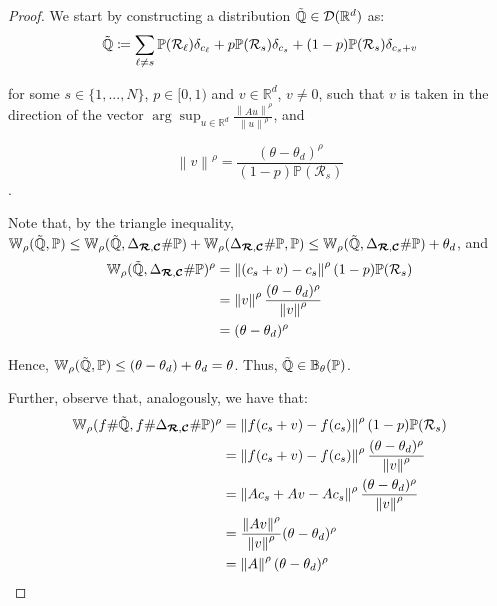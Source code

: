 \documentclass[10pt,a4paper]{amsart}
\def\bsC{{\bm{\mathcal{C}}}}
\def\bsR{{\bm{\mathcal{R}}}}
\def\probQ{\mathbb{Q}}
\def\prob{\mathbb{P}}
\def\realNum{{\mathbb{R}}}
\def\sD{{\mathcal{D}}}
\def\sR{{\mathcal{R}}}
\def\wasserstein{{\mathbb{W}}}
\newcommand{\norm}[1]{\left\lVert#1\right\rVert}
\begin{document}
    \begin{proof}
    We start by constructing a distribution $\Tilde{\probQ} \in \sD(\realNum^d)$ as: 
    \begin{align*}
        \Tilde{\probQ} \coloneqq \sum_{\ell \neq s} \prob(\sR_\ell) \delta_{c_\ell} + p \prob(\sR_s) \delta_{c_s} + (1-p) \prob(\sR_s) \delta_{c_s + v}
    \end{align*}
    
    for some $s \in \{1, ..., N\}$, $p \in [0, 1)$ and $v \in \realNum^d$, $v \neq 0$, such that $v$ is taken in the direction of the vector $\arg\sup_{u \in \realNum^d} \frac{\norm{Au}^\rho}{\norm{u}^\rho}$, and
    
    $$\norm{v}^\rho = \frac{(\theta-\theta_d)^\rho}{(1-p)\prob(\sR_s)}$$. 
    
    Note that, by the triangle inequality, $\wasserstein_\rho(\Tilde{\probQ}, \prob) \leq \wasserstein_\rho(\Tilde{\probQ}, \Delta_{\bsR, \bsC}\#\prob) + \wasserstein_\rho(\Delta_{\bsR, \bsC}\#\prob, \prob) \leq \wasserstein_\rho(\Tilde{\probQ}, \Delta_{\bsR, \bsC}\#\prob) + \theta_d$, and
    \begin{align*}
        \wasserstein_\rho(\Tilde{\probQ}, \Delta_{\bsR, \bsC}\#\prob)^\rho &= \norm{(c_s + v) - c_s}^\rho (1-p)\prob(\sR_s) \\ 
        &= \norm{v}^\rho \frac{(\theta-\theta_d)^\rho}{\norm{v}^\rho} \\ 
        &= (\theta-\theta_d)^\rho
    \end{align*}
    
    Hence, $\wasserstein_\rho(\Tilde{\probQ}, \prob) \leq (\theta-\theta_d) + \theta_d = \theta$. Thus, $\Tilde{\probQ} \in \mathbb{B}_{\theta}(\prob)$.
    
    Further, observe that, analogously, we have that:
    \begin{align*}
        \wasserstein_\rho(f \# \Tilde{\probQ}, f \# \Delta_{\bsR, \bsC}\#\prob)^\rho &= \norm{f(c_s + v) - f(c_s)}^\rho (1-p)\prob(\sR_s) \\
        &= \norm{f(c_s + v) - f(c_s)}^\rho \frac{(\theta-\theta_d)^\rho}{\norm{v}^\rho} \\
        &= \norm{Ac_s + Av - Ac_s}^\rho \frac{(\theta-\theta_d)^\rho}{\norm{v}^\rho} \\
        &= \frac{\norm{Av}^\rho}{\norm{v}^\rho} (\theta-\theta_d)^\rho \\
        &= \norm{A}^\rho (\theta-\theta_d)^\rho
    \end{align*}
    

\end{proof}
\end{document}
